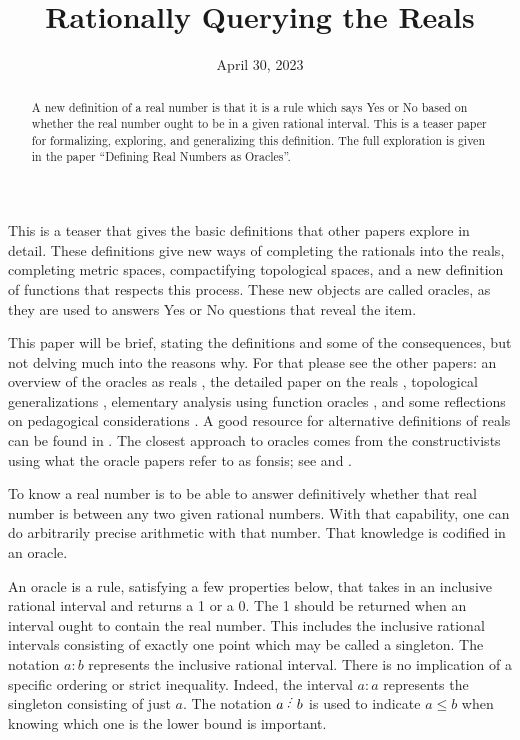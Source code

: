 \documentclass[12pt]{article}
\title{Rationally Querying the Reals}
\date{April 30, 2023}
\begin{document}
\maketitle
\begin{abstract}
A new definition of a real number is that it is a rule which says Yes or No based on whether the real number ought to be in a given rational interval. This is a teaser paper for formalizing, exploring, and generalizing this definition. The full exploration is given in the paper ``Defining Real Numbers as Oracles''. 
\end{abstract}

This is a teaser that gives the basic definitions that other papers explore in detail. These definitions give new ways of completing the rationals into the reals, completing metric spaces, compactifying topological spaces, and a new definition of functions that respects this process. These new objects are called oracles, as they are used to answers Yes or No questions that reveal the item. 

This paper will be brief, stating the definitions and some of the consequences, but not delving much into the reasons why. For that please see the other papers: an overview of the oracles as reals \cite{taylor23over}, the detailed paper on the reals \cite{taylor23main}, topological generalizations \cite{taylor23metric}, elementary analysis using function oracles \cite{taylor23funora}, and some reflections on pedagogical considerations \cite{taylor23edu}. A good resource for alternative definitions of reals can be found in \cite{ittay-2015}. The closest approach to oracles comes from the constructivists using what the oracle papers refer to as fonsis; see \cite{bridger} and \cite{bridges}. 

To know a real number is to be able to answer definitively whether that real number is between any two given rational numbers. With that capability, one can do arbitrarily precise arithmetic with that number. That knowledge is codified in an oracle. 


An oracle is a rule, satisfying a few properties below, that takes in an inclusive rational interval and returns a 1 or a 0. The 1 should be returned when an interval ought to contain the real number. This includes the inclusive rational intervals consisting of exactly one point which may be called a singleton. The notation $a:b$ represents the inclusive rational interval. There is no implication of a specific ordering or strict inequality.  Indeed, the  interval $a:a$ represents the singleton consisting of just $a$. The notation $a\lte b$ is used to indicate $a\leq b$ when knowing which one is the lower bound is important. 
\end{document}
